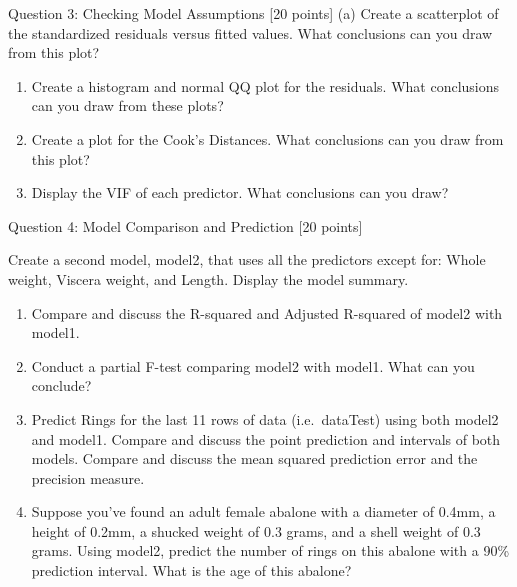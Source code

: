 \documentclass[]{article}
\begin{document}
Question 3: Checking Model Assumptions {[}20 points{]} (a) Create a
scatterplot of the standardized residuals versus fitted values. What
conclusions can you draw from this plot?

\begin{enumerate}
\def\labelenumi{(\alph{enumi})}
\setcounter{enumi}{1}
\item
  Create a histogram and normal QQ plot for the residuals. What
  conclusions can you draw from these plots?
\item
  Create a plot for the Cook's Distances. What conclusions can you draw
  from this plot?
\item
  Display the VIF of each predictor. What conclusions can you draw?
\end{enumerate}

Question 4: Model Comparison and Prediction {[}20 points{]}

Create a second model, model2, that uses all the predictors except for:
Whole weight, Viscera weight, and Length. Display the model summary.

\begin{enumerate}
\def\labelenumi{(\alph{enumi})}
\item
  Compare and discuss the R-squared and Adjusted R-squared of model2
  with model1.
\item
  Conduct a partial F-test comparing model2 with model1. What can you
  conclude?
\item
  Predict Rings for the last 11 rows of data (i.e.~dataTest) using both
  model2 and model1. Compare and discuss the point prediction and
  intervals of both models. Compare and discuss the mean squared
  prediction error and the precision measure.
\item
  Suppose you've found an adult female abalone with a diameter of 0.4mm,
  a height of 0.2mm, a shucked weight of 0.3 grams, and a shell weight
  of 0.3 grams. Using model2, predict the number of rings on this
  abalone with a 90\% prediction interval. What is the age of this
  abalone?
\end{enumerate}
\end{document}

